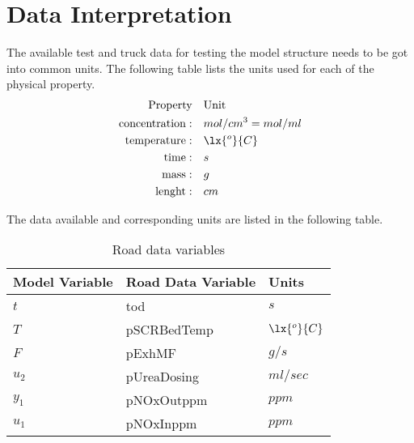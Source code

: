 \newpage
\section{Data Interpretation}
The available test and truck data for testing the model structure needs to be
got into common units. The following table lists the units used for each
of the physical property.
\begin{align*}
    \text{Property}\quad       & \text{Unit} \\
    \text{concentration}: \quad & mol/cm^{3} = mol/ml \\
    \text{temperature}:\quad    & \lx{^o}{C} \\
    \text{time}:\quad           & s \\
    \text{mass}:\quad           & g \\
    \text{lenght}:\quad         & cm \\
\end{align*}

The data available and corresponding units are listed in the following table.

\begin{table}[H]
\centering
\begin{tabular}{l l l }
\hline \hline
Model Variable & Road Data Variable &Units\\
\hline \hline
$t$   & tod & $s$
\\
$T$   & pSCRBedTemp & $\lx{^o}{C}$
\\
$F$   & pExhMF & $g/s$
\\
$u_2$ & pUreaDosing & $ml/sec$
\\
$y_1 $ & pNOxOutppm & $ppm$
\\
$u_1$ & pNOxInppm & $ppm$
\\
\hline
\end{tabular}
\caption{Road data variables}
\end{table}



